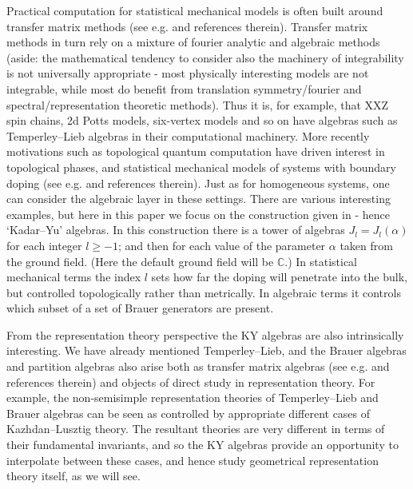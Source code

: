 \documentclass{article}
\theoremstyle{definition}
\newcommand{\xx}{\alpha}       %
\def\C{\mathbb{C}}
\numberwithin{equation}{subsection}
\begin{document}
Practical computation for statistical mechanical models is often built around transfer matrix methods (see e.g. \cite{Baxter81,Baxter83,LiebMattis,Martin91,Wannier,Brown67} %
and references therein). 
Transfer matrix methods in turn rely on a mixture of fourier analytic and algebraic methods (aside: the mathematical tendency to consider also the machinery of integrability is not 
universally  %
appropriate  %
- most physically interesting models are not integrable, while most do benefit from translation symmetry/fourier and spectral/representation theoretic methods). 
Thus it is, for example, that XXZ spin chains, 2d Potts models, six-vertex models and so on have algebras such as Temperley--Lieb algebras \cite{TemperleyLieb71} in their computational machinery. 
More recently motivations such as topological quantum computation have driven interest in topological phases, and statistical mechanical models of systems with boundary doping 
(see e.g. \cite{Fradkin,GuidrySun} and references therein).  
Just as for homogeneous systems, one can consider the algebraic layer in these settings. There are various interesting examples, but here 
in this paper 
we focus on the construction given in \cite{KadarYu} - hence `Kadar--Yu' algebras. 
In this construction there is a tower of algebras $J_l = J_l(\xx)$ for each integer $l \geq -1$;
and then for each value of the parameter $\xx$ taken from the ground field. 
(Here the default ground field will be $\C$.) 
In statistical mechanical terms the index $l$ sets how far the doping will penetrate into the bulk, but controlled topologically rather than metrically. In algebraic terms it controls which subset of a set of Brauer generators are present.

From the representation theory perspective the KY algebras are also intrinsically interesting. We have already mentioned Temperley--Lieb, and the Brauer algebras \cite{Brauer} and partition algebras \cite{Martin91} also arise both as transfer matrix algebras 
(see e.g. \cite{Gainutdinov_2014,Ramgoolam07,Ramgoolam} and references therein)
and objects of direct study in representation theory. 
For example, the non-semisimple representation theories of Temperley--Lieb and Brauer algebras can be seen as controlled by appropriate different cases of Kazhdan--Lusztig theory. The resultant theories are very different in terms of their fundamental invariants, and so the KY algebras provide an opportunity to interpolate between these cases, and hence 
study  %
geometrical representation theory itself, as we will see. 
\end{document}
